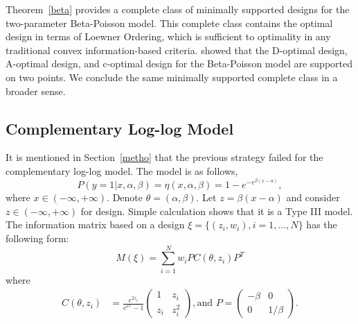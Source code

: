 \documentclass[12pt]{amsart}
\theoremstyle{definition}
\theoremstyle{remark}
\numberwithin{equation}{section}
\begin{document}
Theorem~\ref{beta} provides a complete class of minimally supported designs for the two-parameter Beta-Poisson model. This complete class contains the optimal design in terms of Loewner Ordering, which is sufficient to optimality in any traditional convex information-based criteria. \cite{cand} showed that the D-optimal design, A-optimal design, and c-optimal design for the Beta-Poisson model are supported on two points. We conclude the same minimally supported complete class in a broader sense.

\subsection{Complementary Log-log Model } \label{seccomp}

It is mentioned in Section~\ref{metho} that the previous strategy failed for the complementary log-log model. The model is as follows,\[
P(y=1|x,\alpha, \beta) = \eta(x,\alpha, \beta)= 1-e^{-e^{\beta(x-\alpha)}},
\] where $x\in (-\infty,+\infty)$. Denote $\theta = (\alpha,\beta) $. Let $z = \beta(x-\alpha)$ and consider $z\in (-\infty,+\infty)$ for design. Simple calculation shows that it is a Type III model. The information matrix based on a design $\xi = \{(z_i,w_i), i=1,\ldots,N\}$ has the following form: \begin{equation}
M(\xi) = \sum_{i=1}^{N} w_i PC(\theta,z_i) P^T
\end{equation} where \begin{align*}
     C(\theta,z_i) & = \frac{e^{2z_i}}{e^{e^{z_i}}-1}\left( \begin{array}{cc}
1 & z_i\\
z_i & z_i^2
\end{array} \right), \text{and }
P = \left( \begin{array}{cc}
-\beta & 0\\
0 & 1/\beta
\end{array} \right).
\end{align*}

\end{document}
